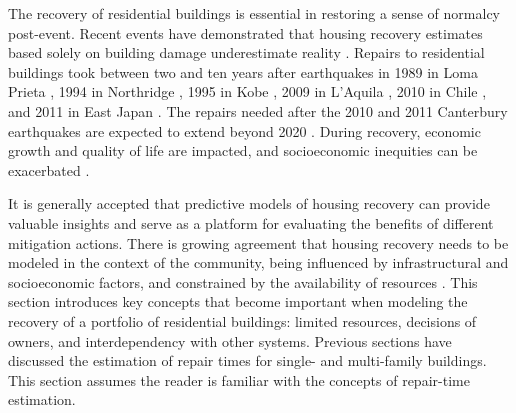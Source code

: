 The recovery of residential buildings is essential in restoring a sense of normalcy post-event. Recent events have demonstrated that housing recovery estimates based solely on building damage underestimate reality \citep{comerio2006estimating}. Repairs to residential buildings took between two and ten years after earthquakes in 1989 in Loma Prieta \citep{comerio2006estimating}, 1994 in Northridge \citep{Olshansky2006}, 1995 in Kobe \citep{comerio2014disaster, Olshansky2006}, 2009 in L'Aquila \citep{di2017reconstruction1, di2017reconstruction2}, 2010 in Chile \citep{comerio2013housing}, and 2011 in East Japan \citep{ranghieri2014learning}. The repairs needed after the 2010 and 2011 Canterbury earthquakes are expected to extend beyond 2020 \citep{BankOfNZ2016}. During recovery, economic growth and quality of life are impacted, and socioeconomic inequities can be exacerbated \citep{peacock2014inequities, wang2015influencing, bolin1985disasters}.\

It is generally accepted that predictive models of housing recovery can provide valuable insights and serve as a platform for evaluating the benefits of different mitigation actions. There is growing agreement that housing recovery needs to be modeled in the context of the community, being influenced by infrastructural and socioeconomic factors, and constrained by the availability of resources \citep{lee2019quantitative, masoomi2018community, ellingwood2018performance, bilau2018practice, Sutley2017a, davidson2015integrating}. This section introduces key concepts that become important when modeling the recovery of a portfolio of residential buildings: limited resources, decisions of owners, and interdependency with other systems. Previous sections have discussed the estimation of repair times for single- and multi-family buildings. This section assumes the reader is familiar with the concepts of repair-time estimation. \ 

